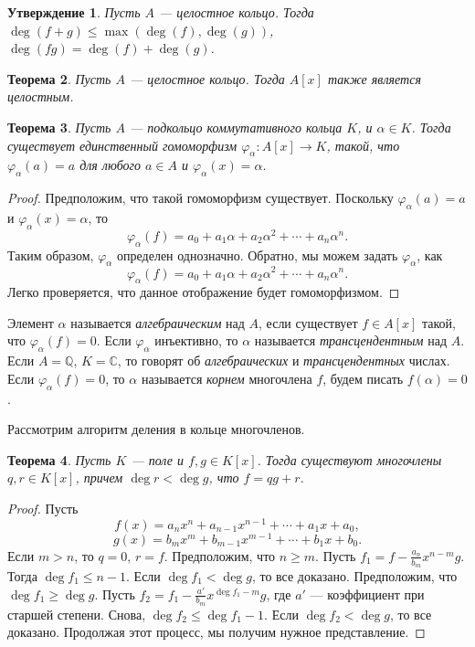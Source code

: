 \documentclass[12pt, titlepage, oneside]{amsbook}
\newcommand{\CC}{\mathbb{C}}
\newcommand{\QQ}{\mathbb{Q}}
\newtheorem{theorem}{Теорема}[chapter]
\newtheorem{claim}[theorem]{Утверждение}
\theoremstyle{definition}
\theoremstyle{remark}
\begin{document}
\begin{claim}
	\label{Mnog1} Пусть $A$ --- целостное кольцо. Тогда $\deg(f+g)\leq\max(\deg(f),\deg(g))$, $\deg(fg)=\deg(f)+\deg(g)$.
\end{claim}

\begin{theorem}
	\label{Mnog2} Пусть $A$ --- целостное кольцо. Тогда $A[x]$ также является целостным.
\end{theorem}

\begin{theorem}
	\label{Mnog3} Пусть $A$ --- подкольцо коммутативного кольца $K$, и $\alpha\in K$. Тогда существует единственный гомоморфизм $\varphi_{\alpha}\colon A[x]\rightarrow K$, такой, что $\varphi_{\alpha}(a)=a$ для любого $a\in A$ и $\varphi_{\alpha}(x)=\alpha$.
\end{theorem}

\begin{proof}
	Предположим, что такой гомоморфизм существует. Поскольку $\varphi_{\alpha}(a)=a$ и $\varphi_{\alpha}(x)=\alpha$, то $$\varphi_{\alpha}(f)=a_0+a_1\alpha+a_2\alpha^2+\cdots+a_n\alpha^n.$$ Таким образом, $\varphi_{\alpha}$ определен однозначно. Обратно, мы можем задать $\varphi_{\alpha}$, как $$\varphi_{\alpha}(f)=a_0+a_1\alpha+a_2\alpha^2+\cdots+a_n\alpha^n.$$ Легко проверяется, что данное отображение будет гомоморфизмом.
\end{proof}

Элемент $\alpha$ называется \emph{алгебраическим} над $A$, если существует $f\in A[x]$ такой, что $\varphi_{\alpha}(f)=0$. Если $\varphi_{\alpha}$ инъективно, то $\alpha$ называется \emph{трансцендентным} над $A$. Если $A=\QQ$, $K=\CC$, то говорят об \emph{алгебраических} и \emph{трансцендентных} числах. Если $\varphi_{\alpha}(f)=0$, то $\alpha$ называется \emph{корнем} многочлена $f$, будем писать $f(\alpha)=0$.

Рассмотрим алгоритм деления в кольце многочленов.
\begin{theorem}
	\label{Mnog4} Пусть $K$ --- поле и $f,g\in K[x]$. Тогда существуют многочлены $q,r\in K[x]$, причем $\deg r<\deg g$, что $f=qg+r$.
\end{theorem}

\begin{proof}
	Пусть $$f(x)=a_nx^n+a_{n-1}x^{n-1}+\cdots+ a_1x+a_0,$$ $$g(x)=b_mx^m+b_{m-1}x^{m-1}+\cdots+b_1x+b_0.$$ Если $m>n$, то $q=0$, $r=f$. Предположим, что $n\geq m$. Пусть $f_1=f-\frac{a_n}{b_m}x^{n-m}g$. Тогда $\deg f_1\leq n-1$. Если $\deg f_1<\deg g$, то все доказано. Предположим, что $\deg f_1\geq\deg g$. Пусть $f_2=f_1-\frac{a'}{b_m}x^{\deg f_1-m}g$, где $a'$ --- коэффициент при старшей степени. Снова, $\deg f_2\leq \deg f_1-1$. Если $\deg f_2<\deg g$, то все доказано. Продолжая этот процесс, мы получим нужное представление.
\end{proof}
\end{document}
